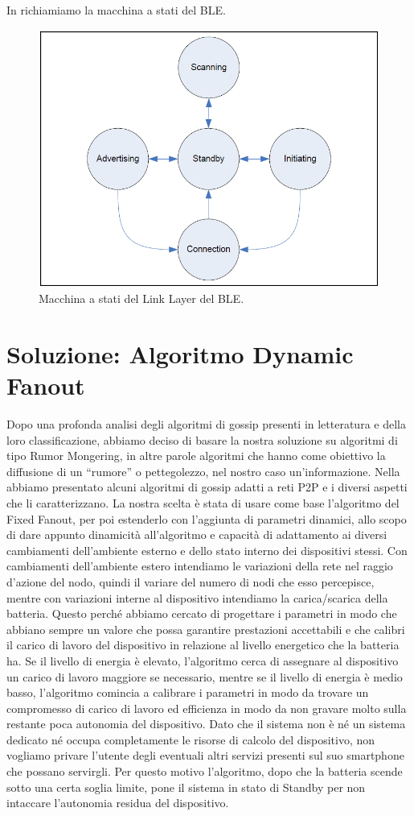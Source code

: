 In  richiamiamo la macchina a stati del BLE.
\begin{figure}[tb]
	\centering
	\includegraphics[width=0.7\linewidth]{Images/bt/bt_fsa}
	\caption[ble fsa]{Macchina a stati del Link Layer del BLE.}
	\label{fig:bt_fsa2}
\end{figure}
\bigskip

\section{Soluzione: Algoritmo Dynamic Fanout}
Dopo una profonda analisi degli algoritmi di gossip presenti in letteratura e della loro classificazione, abbiamo deciso di basare la nostra soluzione su algoritmi di tipo Rumor Mongering, in altre parole algoritmi che hanno come obiettivo la diffusione di un “rumore” o pettegolezzo, nel nostro caso un'informazione. Nella  abbiamo presentato alcuni algoritmi di gossip adatti a reti \acs{P2P} e i diversi aspetti che li caratterizzano. La nostra scelta è stata di usare come base l'algoritmo del Fixed Fanout, per poi estenderlo con l'aggiunta di parametri dinamici, allo scopo di dare appunto dinamicità all'algoritmo e capacità di adattamento ai diversi cambiamenti dell'ambiente esterno e dello stato interno dei dispositivi stessi. Con cambiamenti dell'ambiente estero intendiamo le variazioni della rete nel raggio d'azione del nodo, quindi il variare del numero di nodi che esso percepisce, mentre con variazioni interne al dispositivo intendiamo la carica/scarica della batteria. Questo perché abbiamo cercato di progettare i parametri in modo che abbiano sempre un valore che possa garantire prestazioni accettabili e che calibri il carico di lavoro del dispositivo in relazione al livello energetico che la batteria ha. Se il livello di energia è elevato, l'algoritmo cerca di assegnare al dispositivo un carico di lavoro maggiore se necessario, mentre se il livello di energia è medio basso, l'algoritmo comincia a calibrare i parametri in modo da trovare un compromesso di carico di lavoro ed efficienza in modo da non gravare molto sulla restante poca autonomia del dispositivo. Dato che il sistema non è né un sistema dedicato né occupa completamente le risorse di calcolo del dispositivo, non vogliamo privare l'utente degli eventuali altri servizi presenti sul suo smartphone che possano servirgli. Per questo motivo l'algoritmo, dopo che la batteria scende sotto una certa soglia limite, pone il sistema in stato di Standby per non intaccare l'autonomia residua del dispositivo.


